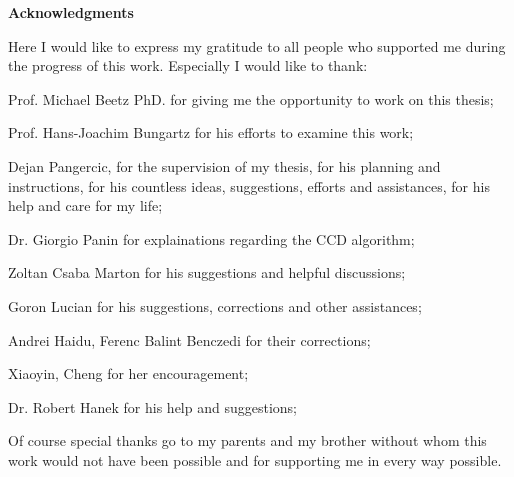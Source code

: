 \clearemptydoublepage
{}
{}        



\vspace*{2cm}

\begin{center}
{\Large \bf Acknowledgments}
\end{center}

\vspace{1cm}




Here I would like to express my gratitude to all people who supported me during the
progress of this work. Especially I would like to thank:

Prof. Michael Beetz PhD. for giving me the opportunity to work on this thesis;

Prof. Hans-Joachim Bungartz for his efforts to examine this work;

Dejan Pangercic, for the supervision of my thesis, for his planning and instructions,
for his countless ideas, suggestions, efforts and assistances, for his help and care for
my life;

Dr. Giorgio Panin for explainations regarding the CCD algorithm;

Zoltan Csaba Marton for his suggestions and helpful discussions;

Goron Lucian for his suggestions, corrections and other assistances;

Andrei Haidu, Ferenc Balint Benczedi for their corrections;

Xiaoyin, Cheng for her encouragement;

Dr. Robert Hanek for his help and suggestions;

Of course special thanks go to my parents and my brother without whom this work
would not have been possible and for supporting me in every way possible.


